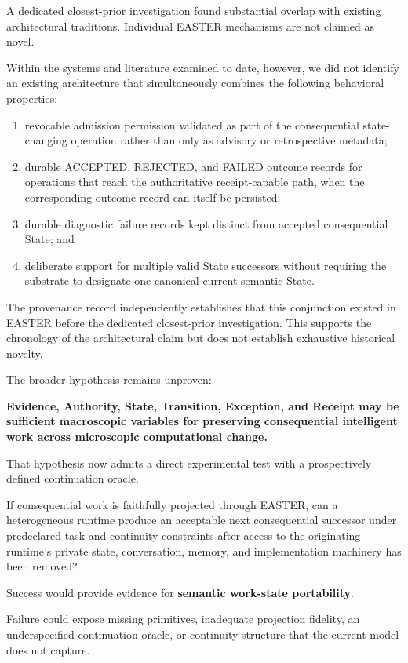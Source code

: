 \documentclass[11pt]{article}
\begin{document}
A dedicated closest-prior investigation found substantial overlap with existing architectural traditions. Individual EASTER mechanisms are not claimed as novel.

Within the systems and literature examined to date, however, we did not identify an existing architecture that simultaneously combines the following behavioral properties:

\begin{enumerate}
\item revocable admission permission validated as part of the consequential state-changing operation rather than only as advisory or retrospective metadata;
\item durable ACCEPTED, REJECTED, and FAILED outcome records for operations that reach the authoritative receipt-capable path, when the corresponding outcome record can itself be persisted;
\item durable diagnostic failure records kept distinct from accepted consequential State; and
\item deliberate support for multiple valid State successors without requiring the substrate to designate one canonical current semantic State.
\end{enumerate}

The provenance record independently establishes that this conjunction existed in EASTER before the dedicated closest-prior investigation. This supports the chronology of the architectural claim but does not establish exhaustive historical novelty.

The broader hypothesis remains unproven:

\textbf{Evidence, Authority, State, Transition, Exception, and Receipt may be sufficient macroscopic variables for preserving consequential intelligent work across microscopic computational change.}

That hypothesis now admits a direct experimental test with a prospectively defined continuation oracle.

If consequential work is faithfully projected through EASTER, can a heterogeneous runtime produce an acceptable next consequential successor under predeclared task and continuity constraints after access to the originating runtime's private state, conversation, memory, and implementation machinery has been removed?

Success would provide evidence for \textbf{semantic work-state portability}.

Failure could expose missing primitives, inadequate projection fidelity, an underspecified continuation oracle, or continuity structure that the current model does not capture.
\end{document}
